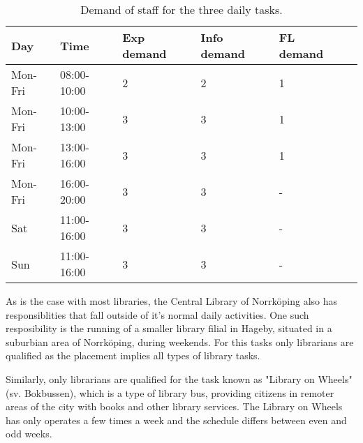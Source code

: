 \begin{table}[h]
\centering
\caption{Demand of staff for the three daily tasks.}
\label{tab:Outer_Task_Demand}
\begin{tabularx}{\textwidth}{|X|l|l|l|l|X|}
\hline
\textbf{Day} & \textbf{Time} & \textbf{Exp demand} & \textbf{Info demand} & \textbf{FL demand}
\\ \hline 
Mon-Fri & 08:00-10:00 & 2 & 2 & 1
\\ \hline 
Mon-Fri & 10:00-13:00 & 3 & 3 & 1
\\ \hline 
Mon-Fri & 13:00-16:00  & 3 & 3 & 1
\\ \hline 
Mon-Fri & 16:00-20:00 & 3 & 3 & -
\\ \hline 
Sat & 11:00-16:00  & 3 & 3 & -
\\ \hline 
Sun & 11:00-16:00  & 3 & 3 & -
\\ \hline 
\end{tabularx}
\end{table} 


As is the case with most libraries, the Central Library of Norrköping also has responsiblities that fall outside of it's normal daily activities. One such resposibility is the running of a smaller library filial in Hageby, situated in a suburbian area of Norrköping, during weekends. For this tasks only librarians are qualified as the placement implies all types of library tasks.

Similarly, only librarians are qualified for the task known as "Library on Wheels" (sv. Bokbussen), which is a type of library bus, providing citizens in remoter areas of the city with books and other library services. The Library on Wheels has only operates a few times a week and the schedule differs between even and odd weeks.

